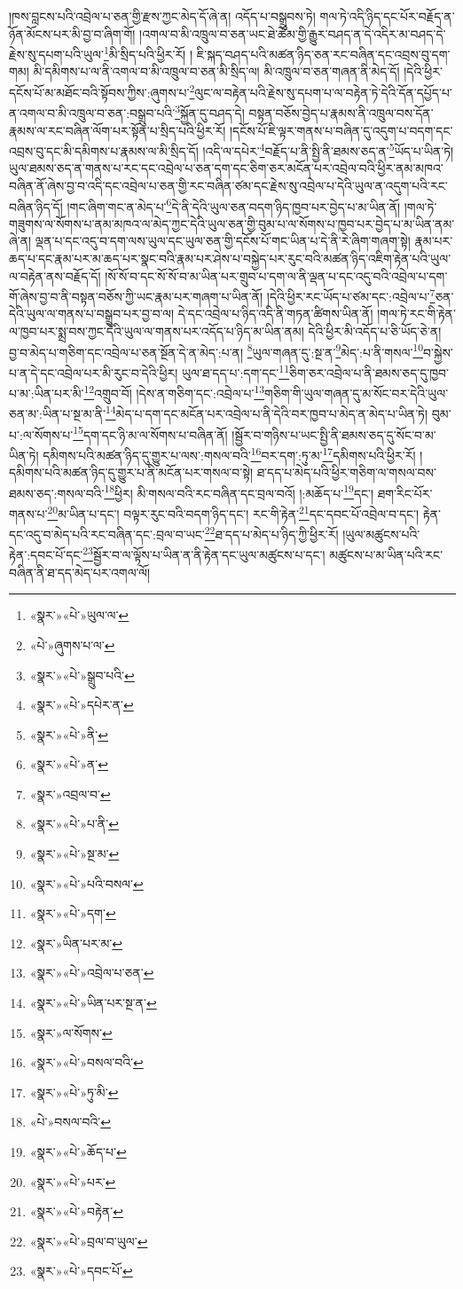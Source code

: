 །ཁས་བླངས་པའི་འབྲེལ་པ་ཅན་གྱི་རྫས་ཀྱང་མེད་དོ་ཞེ་ན། འདོད་པ་བསྒྲུབས་ཏེ། གལ་ཏེ་འདི་ཉིད་དང་པོར་བརྗོད་ན་ཉོན་མོངས་པར་མི་བྱ་བ་ཞིག་གོ། །འགལ་བ་མི་འཁྲུལ་བ་ཅན་ཡང་ཐེ་ཚོམ་གྱི་རྒྱུར་བཤད་ན་དེ་འདིར་མ་བཤད་དེ་རྗེས་སུ་དཔག་པའི་ཡུལ་\footnote{«སྣར་»«པེ་»ཡུལ་ལ་}མི་སྲིད་པའི་ཕྱིར་རོ། །
ཇི་སྐད་བཤད་པའི་མཚན་ཉིད་ཅན་རང་བཞིན་དང་འབྲས་བུ་དག་གམ། མི་དམིགས་པ་ལ་ནི་འགལ་བ་མི་འཁྲུལ་བ་ཅན་མི་སྲིད་ལ། མི་འཁྲུལ་བ་ཅན་གཞན་ནི་མེད་དོ། །དེའི་ཕྱིར་དངོས་པོ་མ་མཐོང་བའི་སྟོབས་ཀྱིས་:ཞུགས་པ་\footnote{«པེ་»ཞུགས་པ་ལ་}ལུང་ལ་བརྟེན་པའི་རྗེས་སུ་དཔག་པ་ལ་བརྟེན་ཏེ་དེའི་དོན་དཔྱོད་པ་ན་འགལ་བ་མི་འཁྲུལ་བ་ཅན་:བསྒྲུབ་པའི་\footnote{«སྣར་»«པེ་»སྒྲུབ་པའི་}སྐྱོན་དུ་བཤད་དེ། བསྟན་བཅོས་བྱེད་པ་རྣམས་ནི་འཁྲུལ་བས་དོན་རྣམས་ལ་རང་བཞིན་ལོག་པར་སྟོན་པ་སྲིད་པའི་ཕྱིར་རོ། །དངོས་པོ་ཇི་ལྟར་གནས་པ་བཞིན་དུ་འདུག་པ་བདག་དང་འབྲས་བུ་དང་མི་དམིགས་པ་རྣམས་ལ་མི་སྲིད་དོ། །འདི་ལ་དཔེར་\footnote{«སྣར་»«པེ་»དཔེར་ན་}བརྗོད་པ་ནི་སྤྱི་ནི་ཐམས་ཅད་ན་\footnote{«སྣར་»«པེ་»ནི་}ཡོད་པ་ཡིན་ཏེ། ཡུལ་ཐམས་ཅད་ན་གནས་པ་རང་དང་འབྲེལ་པ་ཅན་དག་དང་ཅིག་ཅར་མངོན་པར་འབྲེལ་བའི་ཕྱིར་ནམ་མཁའ་བཞིན་ནོ་ཞེས་བྱ་བ་འདི་དང་འབྲེལ་པ་ཅན་གྱི་རང་བཞིན་ཙམ་དང་རྗེས་སུ་འབྲེལ་པ་དེའི་ཡུལ་ན་འདུག་པའི་རང་བཞིན་ཉིད་དོ། །གང་ཞིག་གང་ན་མེད་པ་\footnote{«སྣར་»«པེ་»ན་}དེ་ནི་དེའི་ཡུལ་ཅན་བདག་ཉིད་ཁྱབ་པར་བྱེད་པ་མ་ཡིན་ནོ། །གལ་ཏེ་གཟུགས་ལ་སོགས་པ་ནམ་མཁའ་ལ་མེད་ཀྱང་དེའི་ཡུལ་ཅན་གྱི་བུམ་པ་ལ་སོགས་པ་ཁྱབ་པར་བྱེད་པ་མ་ཡིན་ནམ་ཞེ་ན། ལྡན་པ་དང་འདུ་བ་དག་ལས་ཡུལ་དང་ཡུལ་ཅན་གྱི་དངོས་པོ་གང་ཡིན་པ་དེ་ནི་རེ་ཞིག་གཞག་སྟེ། རྣམ་པར་ཆད་པ་དང་རྣམ་པར་མ་ཆད་པར་སྣང་བའི་རྣམ་པར་ཤེས་པ་བསྐྱེད་པར་རུང་བའི་མཚན་ཉིད་འཇིག་རྟེན་པའི་ཡུལ་ལ་བརྟེན་ནས་བརྗོད་དོ། །སོ་སོ་བ་དང་སོ་སོ་བ་མ་ཡིན་པར་གྲུབ་པ་དག་ལ་ནི་ལྡན་པ་དང་འདུ་བའི་འབྲེལ་པ་དག་གོ་ཞེས་བྱ་བ་ནི་བསྟན་བཅོས་ཀྱི་ཡང་རྣམ་པར་གཞག་པ་ཡིན་ནོ། །དེའི་ཕྱིར་རང་ཡོད་པ་ཙམ་དང་:འབྲེལ་པ་\footnote{«སྣར་»འབྲལ་བ་}ཅན་དེའི་ཡུལ་ལ་གནས་པ་བསྒྲུབ་པར་བྱ་བ་ལ། དེ་དང་འབྲེལ་པ་ཉིད་འདི་ནི་གཏན་ཚིགས་ཡིན་ནོ། །གལ་ཏེ་རང་གི་རྟེན་ལ་ཁྱབ་པར་སྨྲ་བས་ཀྱང་དེའི་ཡུལ་ལ་གནས་པར་འདོད་པ་ཉིད་མ་ཡིན་ནམ། དེའི་ཕྱིར་མི་འདོད་པ་ཅི་ཡོད་ཅེ་ན། བྱ་བ་མེད་པ་གཅིག་དང་འབྲེལ་པ་ཅན་སྔོན་དེ་ན་མེད་:པ་ན། \footnote{«སྣར་»«པེ་»པ་ནི་}ཡུལ་གཞན་དུ་:སྔ་ན་\footnote{«སྣར་»«པེ་»སྔ་མ་}མེད་:པ་ནི་གསལ་\footnote{«སྣར་»«པེ་»པའི་བསལ་}བ་སྐྱེས་པ་ན་དེ་དང་འབྲེལ་པར་མི་རུང་བ་དེའི་ཕྱིར། ཡུལ་ཐ་དད་པ་:དག་དང་\footnote{«སྣར་»«པེ་»དག་}ཅིག་ཅར་འབྲེལ་པ་ནི་ཐམས་ཅད་དུ་ཁྱབ་པ་མ་:ཡིན་པར་མི་\footnote{«སྣར་»ཡིན་པར་མ་}འགྲུབ་བོ། །དེས་ན་གཅིག་དང་:འབྲེལ་པ་\footnote{«སྣར་»«པེ་»འབྲེལ་པ་ཅན་}གཅིག་གི་ཡུལ་གཞན་དུ་མ་སོང་བར་དེའི་ཡུལ་ཅན་མ་:ཡིན་པ་སྔ་མ་ནི་\footnote{«སྣར་»«པེ་»ཡིན་པར་སྔ་ན་}མེད་པ་དག་དང་མངོན་པར་འབྲེལ་པ་ནི་དེའི་བར་ཁྱབ་པ་མེད་ན་མེད་པ་ཡིན་ཏེ། བུམ་པ་:ལ་སོགས་པ་\footnote{«སྣར་»ལ་སོགས་}དག་དང་ཉི་མ་ལ་སོགས་པ་བཞིན་ནོ། །སྦྱོར་བ་གཉིས་པ་ཡང་སྤྱི་ནི་ཐམས་ཅད་དུ་སོང་བ་མ་ཡིན་ཏེ། དམིགས་པའི་མཚན་ཉིད་དུ་གྱུར་པ་ལས་:གསལ་བའི་\footnote{«སྣར་»«པེ་»བསལ་བའི་}བར་དག་:ཏུ་མ་\footnote{«སྣར་»«པེ་»ཏུ་མི་}དམིགས་པའི་ཕྱིར་རོ། །དམིགས་པའི་མཚན་ཉིད་དུ་གྱུར་པ་ནི་མངོན་པར་གསལ་བ་སྟེ། ཐ་དད་པ་མེད་པའི་ཕྱིར་གཅིག་ལ་གསལ་བས་ཐམས་ཅད་:གསལ་བའི་\footnote{«པེ་»བསལ་བའི་}ཕྱིར། མི་གསལ་བའི་རང་བཞིན་དང་བྲལ་བའོ། །:མཆོད་པ་\footnote{«སྣར་»«པེ་»ཆོད་པ་}དང་། ཐག་རིང་པོར་གནས་པ་\footnote{«སྣར་»«པེ་»པར་}མ་ཡིན་པ་དང་། བལྟར་རུང་བའི་བདག་ཉིད་དང་། རང་གི་རྟེན་\footnote{«སྣར་»«པེ་»བརྟེན་}དང་དབང་པོ་འབྲེལ་བ་དང་། རྟེན་དང་འདུ་བ་མེད་པའི་རང་བཞིན་དང་:བྲལ་བ་ཡང་\footnote{«སྣར་»«པེ་»བྲལ་བ་ཡུལ་}ཐ་དད་པ་མེད་པ་ཉིད་ཀྱི་ཕྱིར་རོ། །ཡུལ་མཚུངས་པའི་རྟེན་:དབང་པོ་དང་\footnote{«སྣར་»«པེ་»དབང་པོ་}སྦྱོར་བ་ལ་ལྟོས་པ་ཡིན་ན་ནི་རྟེན་དང་ཡུལ་མཚུངས་པ་དང་། མཚུངས་པ་མ་ཡིན་པའི་རང་བཞིན་ནི་ཐ་དད་མེད་པར་འགལ་ལོ། 